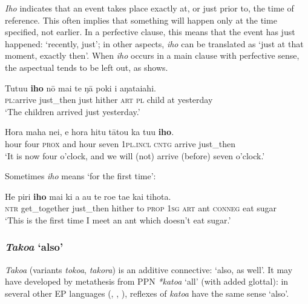 \textit{Iho} indicates that an event takes place exactly at, or just prior to, the time of reference. This often implies that something will happen only at the time specified, not earlier. In a perfective clause, this means that the event has just happened: ‘recently, just’; in other aspects, \textit{iho} can be translated as ‘just at that moment, exactly then’. When \textit{iho} occurs in a main clause with perfective sense, the aspectual tends to be left out, as  shows. 

\ea\label{ex:4.129}
\gll Tutu{\ꞌ}u \textbf{iho} nō mai te ŋā poki {\ꞌ}i {\ꞌ}aŋataiahi. \\
\textsc{pl}:arrive just\_then just hither \textsc{art} \textsc{pl} child at yesterday \\

\glt 
‘The children arrived just yesterday.’ \textstyleExampleref{[R245.225]} 
\z

\ea\label{ex:4.130}
\gll Hora maha nei, {\ꞌ}e hora hitu tātou ka tu{\ꞌ}u \textbf{iho}. \\
hour four \textsc{prox} and hour seven \textsc{1pl.incl} \textsc{cntg} arrive just\_then \\

\glt
‘It is now four o’clock, and we will (not) arrive (before) seven o’clock.’ \textstyleExampleref{[R210.198]} 
\z

Sometimes \textit{iho} means ‘for the first time’:

\ea\label{ex:4.131}
\gll He piri \textbf{iho} mai ki a au te roe ta{\ꞌ}e kai tihota. \\
\textsc{ntr} get\_together just\_then hither to \textsc{prop} \textsc{1sg} \textsc{art} ant \textsc{conneg} eat sugar \\

\glt 
‘This is the first time I meet an ant which doesn’t eat sugar.’ \textstyleExampleref{[R214.008]} 
\z

\subsubsection{\textit{Tako{\ꞌ}a} ‘also’}\label{sec:4.5.3.2}
\textit{Tako{\ꞌ}a} (variants \textit{toko{\ꞌ}a}, \textit{takora}) is an additive connective: ‘also, as well’. It may have developed by metathesis from PPN \textit{*katoa} ‘all’ (with added glottal): in several other EP languages (, , ), reflexes of \textit{katoa} have the same sense ‘also’.

